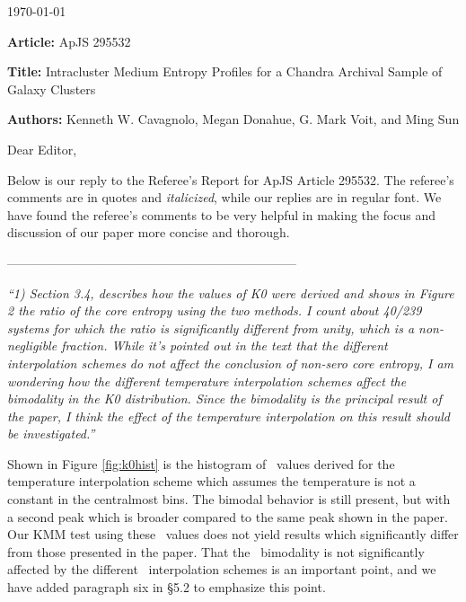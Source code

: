 \documentclass[11pt]{article}
\begin{document}
\today

{\bf{Article:}} ApJS 295532

{\bf{Title:}} Intracluster Medium Entropy Profiles for a Chandra Archival
Sample of Galaxy Clusters

{\bf{Authors:}} Kenneth W. Cavagnolo, Megan Donahue, G. Mark Voit, and Ming
Sun

Dear Editor,

Below is our reply to the Referee's Report for ApJS Article 295532.
The referee's comments are in quotes and {\it{italicized}}, while our
replies are in regular font. We have found the referee's comments to
be very helpful in making the focus and discussion of our paper more
concise and thorough.

---------------------------------------------------------------------

{\it{``1) Section 3.4, describes how the values of K0 were derived and
    shows in Figure 2 the ratio of the core entropy using the two
    methods. I count about 40/239 systems for which the ratio is
    significantly different from unity, which is a non-negligible
    fraction. While it's pointed out in the text that the different
    interpolation schemes do not affect the conclusion of non-sero
    core entropy, I am wondering how the different temperature
    interpolation schemes affect the bimodality in the K0
    distribution. Since the bimodality is the principal result of the
    paper, I think the effect of the temperature interpolation on this
    result should be investigated.''}}

Shown in Figure \ref{fig:k0hist} is the histogram of \kna\ values
derived for the temperature interpolation scheme which assumes the
temperature is not a constant in the centralmost bins. The bimodal
behavior is still present, but with a second peak which is broader
compared to the same peak shown in the paper. Our KMM test using these
\kna\ values does not yield results which significantly differ from
those presented in the paper. That the \kna\ bimodality is not
significantly affected by the different \Tx\ interpolation schemes is
an important point, and we have added paragraph six in \S 5.2 to
emphasize this point.
\end{document}
